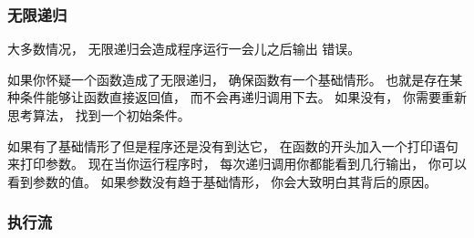 \subsubsection{无限递归}



大多数情况， 无限递归会造成程序运行一会儿之后输出 
 错误。  


如果你怀疑一个函数造成了无限递归， 确保函数有一个基础情形。  
也就是存在某种条件能够让函数直接返回值， 而不会再递归调用下去。  
如果没有， 你需要重新思考算法， 找到一个初始条件。  


如果有了基础情形了但是程序还是没有到达它， 在函数的开头加入一个打印语句来打印参数。  
现在当你运行程序时， 每次递归调用你都能看到几行输出， 你可以看到参数的值。  
如果参数没有趋于基础情形， 你会大致明白其背后的原因。  

\subsubsection{执行流}



